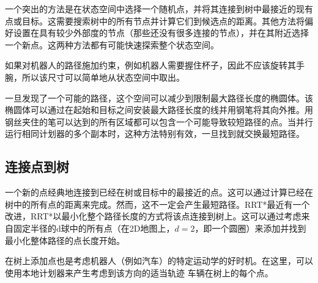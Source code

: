 一个突出的方法是在状态空间中选择一个随机点，并将其连接到树中最接近的现有点或目标。这需要搜索树中的所有节点并计算它们到候选点的距离。其他方法将偏好设置在具有较少外部度的节点（那些还没有很多连接的节点），并在其附近选择一个新点。这两种方法都有可能快速探索整个状态空间。

如果对机器人的路径施加约束，例如机器人需要握住杯子，因此不应该旋转其手腕，所以该尺寸可以简单地从状态空间中取出。

一旦发现了一个可能的路径，这个空间可以减少到限制最大路径长度的椭圆体。该椭圆体可以通过在起始和目标之间安装最大路径长度的线并用钢笔将其向外推。用钢丝夹住的笔可以达到的所有区域都可以包含一个可能导致较短路径的点。当并行运行相同计划器的多个副本时，这种方法特别有效，一旦找到\cite{otte2012}就交换最短路径。



\subsection{连接点到树}
一个新的点经典地连接到已经在树或目标中的最接近的点。这可以通过计算已经在树中的所有点的距离来完成。然而，这不一定会产生最短路径。RRT*最近有一个改进，RRT*以最小化整个路径长度的方式将该点连接到树上。这可以通过考虑来自固定半径的d球中的所有点（在2D地图上，$d=2$，即一个圆圈）来添加并找到最小化整体路径的点长度开始。

在树上添加点也是考虑机器人（例如汽车）的特定运动学的好时机。在这里，可以使用本地计划器来产生考虑到该方向的适当轨迹
车辆在树上的每个点。


